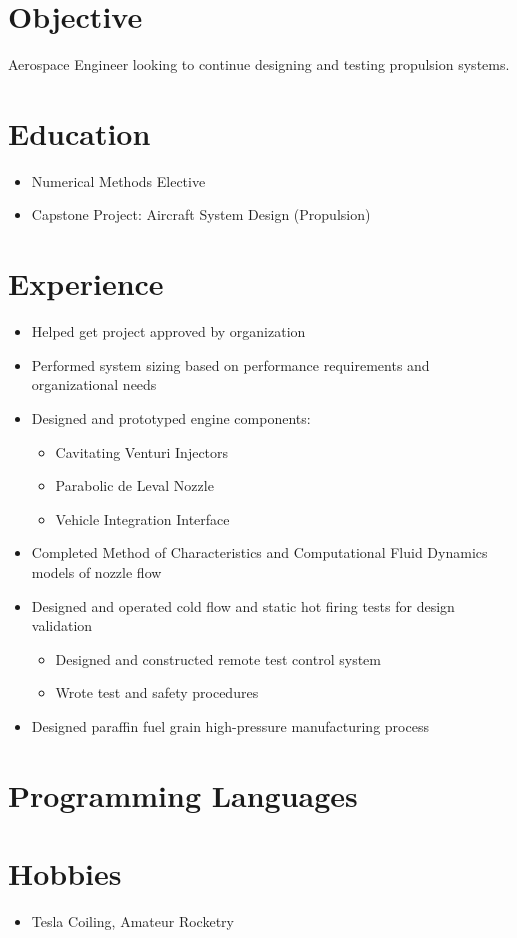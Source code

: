 \documentclass[11pt]{moderncv}
\begin{document}
\makecvtitle

\section{Objective}
Aerospace Engineer looking to continue designing and testing propulsion systems.
\section{Education}
\begin{itemize}
\item Numerical Methods Elective
\item Capstone Project: Aircraft System Design (Propulsion)
\end{itemize}
\section{Experience}
\begin{itemize}
\item Helped get project approved by organization
\item Performed system sizing based on performance requirements and organizational needs
\item Designed and prototyped engine components:
      \begin{itemize}
      \item Cavitating Venturi Injectors
      \item Parabolic de Leval Nozzle
      \item Vehicle Integration Interface
      \end{itemize}
\item Completed Method of Characteristics and Computational Fluid Dynamics models of nozzle flow
\item Designed and operated cold flow and static hot firing tests for design validation
      \begin{itemize}
      \item Designed and constructed remote test control system
      \item Wrote test and safety procedures
      \end{itemize}
\item Designed paraffin fuel grain high-pressure manufacturing process
\end{itemize}

\section{Programming Languages}


\section{Hobbies}
\begin{itemize}
\item Tesla Coiling, Amateur Rocketry
\end{itemize}
\end{document}
